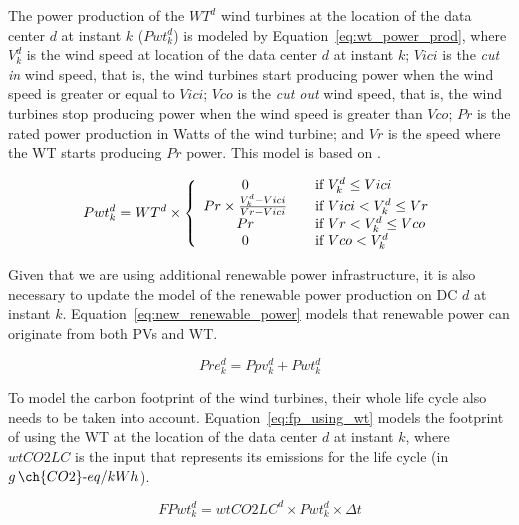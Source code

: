 The power production of the $WT^d$ wind turbines at the location of the data center $d$ at instant $k$ ($Pwt^d_{k}$) is modeled by Equation~\ref{eq:wt_power_prod}, where $V^d_k$ is the wind speed at location of the data center $d$ at instant $k$; $Vici$ is the \textit{cut in} wind speed, that is, the wind turbines start producing power when the wind speed is greater or equal to $Vici$; $Vco$ is the \textit{cut out} wind speed, that is, the wind turbines stop producing power when the wind speed is greater than $Vco$; $Pr$ is the rated power production in Watts of the wind turbine; and $Vr$ is the speed where the WT starts producing $Pr$ power. This model is based on \cite{HADDAD2021100505}.


\begin{equation} \label{eq:wt_power_prod}
Pwt^d_{k} = WT^d \times \left\{ 
  \begin{array}{ c l }
    0   & \quad \textrm{if } V^d_k \leq Vici \\
    Pr \times \frac{V^d_k - Vici}{Vr - Vici}  & \quad \textrm{if } Vici < V^d_k \leq Vr \\
    Pr  & \quad \textrm{if } Vr < V^d_k \leq Vco \\
    0  & \quad \textrm{if } Vco < V^d_k \\
  \end{array}
\right.
\end{equation}


Given that we are using additional renewable power infrastructure, it is also necessary to update the model of the renewable power production on DC $d$ at instant $k$. Equation~\eqref{eq:new_renewable_power} models that renewable power can originate from both PVs and WT.

\begin{equation} \label{eq:new_renewable_power}
    Pre^d_{k}= Ppv^d_{k} + Pwt^d_{k}
\end{equation}


To model the carbon footprint of the wind turbines, their whole life cycle also needs to be taken into account. Equation~\eqref{eq:fp_using_wt} models the footprint of using the WT at the location of the data center $d$ at instant $k$, where $wtCO2LC$ is the input that represents its emissions for the life cycle (in $g\,\ch{CO2}\text{-}eq/kWh$).

\begin{equation}\label{eq:fp_using_wt}
   FPwt^d_k =  wtCO2LC^d \times Pwt^d_{k}\times \Delta t
\end{equation}

